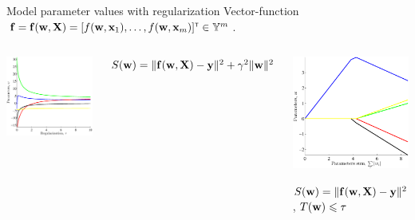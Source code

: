 \documentclass{beamer}
\begin{document}
\begin{frame}{Model parameter values with regularization}
Vector-function~${\mathbf{f}} ={\mathbf{f}}({\mathbf{w}},{\mathbf{X}})=[f({\mathbf{w}},{\mathbf{x}}_1),\ldots,f({\mathbf{w}},{\mathbf{x}}_m)]^{\text{\tiny\sffamily\upshape\mdseries T}} \in \mathbb{Y}^m$.
\begin{columns}[c]
\centering \includegraphics[width=\textwidth]{ridgeparams.eps}  \par $S(\mathbf{w})= \|{\mathbf{f}}(\mathbf{w},
{\mathbf{X}})-{\mathbf{y}}\|^2 + \gamma^2\|\mathbf{w}\|^2$
\begin{center}
\includegraphics[width=\textwidth]{lassoparams.eps} \par $S(\mathbf{w})= \|{\mathbf{f}}(\mathbf{w},{\mathbf{X}})-{\mathbf{y}}\|^2$, $T(\mathbf{w})\leqslant\tau$
\end{center}
\end{columns}
\end{frame}
\end{document}
